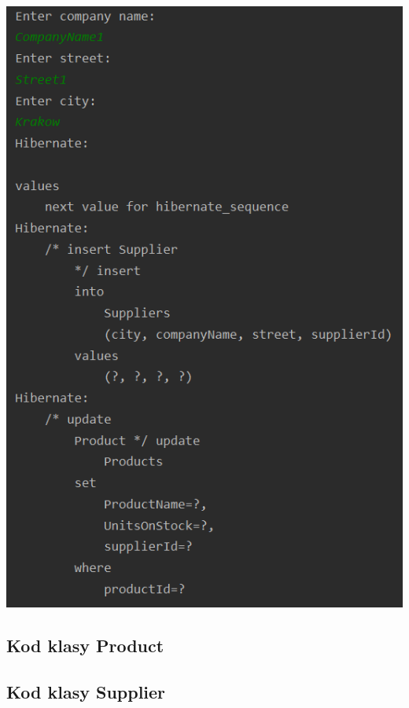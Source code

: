\documentclass[a4paper, 11pt]{article}
\begin{document}
    \begin{center}
        \includegraphics{images/point3/addSupplier.png}
    \end{center}

    \newpage

    \subsection{Kod klasy Product}
    

    \newpage

    \subsection{Kod klasy Supplier}
    
\end{document}

